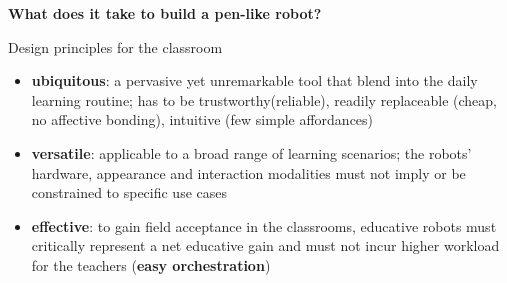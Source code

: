 \documentclass[compress]{beamer}
\begin{document}


\begin{frame}[plain]
    \Large\bf\centering
    What does it take to build a pen-like robot?
\end{frame}




{
 \begin{frame}{Design principles for the classroom}

     \begin{itemize}
         \item<1-> {\bf ubiquitous}: a pervasive yet unremarkable tool
             that blend into the daily learning routine; has to be
             trustworthy(\ie reliable), readily replaceable (\ie cheap, no
             affective bonding), intuitive (\ie few simple affordances)

         \item<2-> {\bf versatile}: applicable to a broad range of learning
             scenarios; the robots’ hardware, appearance and interaction
             modalities must not imply or be constrained to specific use cases

         \item<3-> {\bf effective}: to gain field
             acceptance in the classrooms, educative robots must critically
             represent a net educative gain and must not incur higher
             workload for the teachers (\textbf{easy orchestration})
     \end{itemize}

 \end{frame}
}


\end{document}
